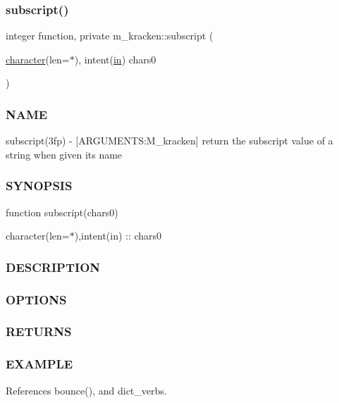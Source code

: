 \subsubsection{\texorpdfstring{subscript()}{subscript()}}
{\footnotesize\ttfamily integer function, private m\+\_\+kracken\+::subscript (\begin{DoxyParamCaption}\item[{\hyperlink{option__stopwatch_83_8txt_abd4b21fbbd175834027b5224bfe97e66}{character}(len=$\ast$), intent(\hyperlink{M__journal_83_8txt_afce72651d1eed785a2132bee863b2f38}{in})}]{chars0 }\end{DoxyParamCaption})\hspace{0.3cm}{\ttfamily [private]}}



\subsubsection*{N\+A\+ME}

subscript(3fp) -\/ \mbox{[}A\+R\+G\+U\+M\+E\+N\+TS\+:M\+\_\+kracken\mbox{]} return the subscript value of a string when given it\textquotesingle{}s name \subsubsection*{S\+Y\+N\+O\+P\+S\+IS}

function subscript(chars0)

character(len=$\ast$),intent(in) \+:\+: chars0 \subsubsection*{D\+E\+S\+C\+R\+I\+P\+T\+I\+ON}

\subsubsection*{O\+P\+T\+I\+O\+NS}

\subsubsection*{R\+E\+T\+U\+R\+NS}

\subsubsection*{E\+X\+A\+M\+P\+LE}

References bounce(), and dict\+\_\+verbs.



